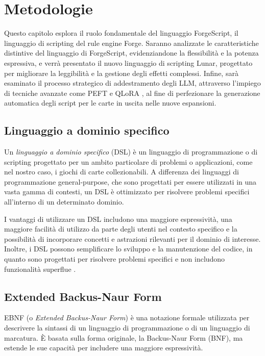 \chapter{Metodologie}\label{chapter:metodologie}
Questo capitolo esplora il ruolo fondamentale del linguaggio ForgeScript, il linguaggio di scripting del rule engine Forge. Saranno analizzate le caratteristiche distintive del linguaggio di ForgeScript, evidenziandone la flessibilità e la potenza espressiva, e verrà presentato il nuovo linguaggio di scripting Lunar, progettato per migliorare la leggibilità e la gestione degli effetti complessi. Infine, sarà esaminato il processo strategico di addestramento degli LLM, attraverso l'impiego di tecniche avanzate come PEFT \cite{peft} e QLoRA \cite{dettmers2023qlora}, al fine di perfezionare la generazione automatica degli script per le carte in uscita nelle nuove espansioni.


\section{Linguaggio a dominio specifico}\label{sec:dsl}
Un \emph{linguaggio a dominio specifico} (DSL) è un linguaggio di programmazione o di scripting progettato per un ambito particolare di problemi o applicazioni, come nel nostro caso, i giochi di carte collezionabili. A differenza dei linguaggi di programmazione general-purpose, che sono progettati per essere utilizzati in una vasta gamma di contesti, un DSL è ottimizzato per risolvere problemi specifici all'interno di un determinato dominio.

I vantaggi di utilizzare un DSL includono una maggiore espressività, una maggiore facilità di utilizzo da parte degli utenti nel contesto specifico e la possibilità di incorporare concetti e astrazioni rilevanti per il dominio di interesse. Inoltre, i DSL possono semplificare lo sviluppo e la manutenzione del codice, in quanto sono progettati per risolvere problemi specifici e non includono funzionalità superflue \cite{fowler-dsl}.

\section{Extended Backus-Naur Form}\label{sec:ebnf}
EBNF (o \textit{Extended Backus-Naur Form}) è una notazione formale utilizzata per descrivere la sintassi di un linguaggio di programmazione o di un linguaggio di marcatura. È basata sulla forma originale, la Backus-Naur Form (BNF), ma estende le sue capacità per includere una maggiore espressività.

